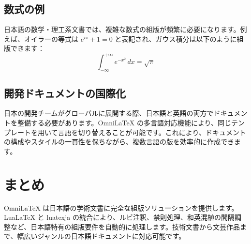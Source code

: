 \documentclass[
    language=japanese,
    doctype=article,
    institution=none,
]{../../omnilatex}
\begin{document}
\subsection{数式の例}
日本語の数学・理工系文書では、複雑な数式の組版が頻繁に必要になります。例えば、オイラーの等式は $e^{i\pi} + 1 = 0$ と表記され、ガウス積分は以下のように組版できます：
\[
\int_{-\infty}^{+\infty} e^{-x^2} \, dx = \sqrt{\pi}
\]

\subsection{開発ドキュメントの国際化}
日本の開発チームがグローバルに展開する際、日本語と英語の両方でドキュメントを整備する必要があります。OmniLaTeX の多言語対応機能により、同じテンプレートを用いて言語を切り替えることが可能です。これにより、ドキュメントの構成やスタイルの一貫性を保ちながら、複数言語の版を効率的に作成できます。

\section{まとめ}
OmniLaTeX は日本語の学術文書に完全な組版ソリューションを提供します。LuaLaTeX と luatexja の統合により、ルビ注釈、禁則処理、和英混植の間隔調整など、日本語特有の組版要件を自動的に処理します。技術文書から文芸作品まで、幅広いジャンルの日本語ドキュメントに対応可能です。
\end{document}
